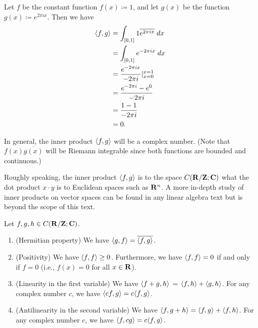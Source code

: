 \begin{example}\label{5.2.3}
    Let \(f\) be the constant function \(f(x) \coloneqq 1\), and let \(g(x)\) be the function \(g(x) \coloneqq e^{2 \pi i x}\).
    Then we have
    \begin{align*}
        \inner*{f, g} & = \int_{[0, 1]} 1 \overline{e^{2 \pi i x}} \; dx      \\
                      & = \int_{[0, 1]} e^{- 2 \pi i x} \; dx                 \\
                      & = \frac{e^{- 2 \pi i x}}{- 2 \pi i} |_{x = 0}^{x = 1} \\
                      & = \frac{e^{- 2 \pi i } - e^0}{- 2 \pi i}              \\
                      & = \frac{1 - 1}{- 2 \pi i}                             \\
                      & = 0.
    \end{align*}
\end{example}

\begin{remark}\label{5.2.4}
    In general, the inner product \(\inner*{f, g}\) will be a complex number.
    (Note that \(f(x) \overline{g(x)}\) will be Riemann integrable since both functions are bounded and continuous.)
\end{remark}

\begin{note}
    Roughly speaking, the inner product \(\inner*{f, g}\) is to the space \(C(\R / \Z ; \C)\) what the dot product \(x \cdot y\) is to Euclidean spaces such as \(\R^n\).
    A more in-depth study of inner products on vector spaces can be found in any linear algebra text but is beyond the scope of this text.
\end{note}

\begin{lemma}\label{5.2.5}
    Let \(f, g, h \in C(\R / \Z ; \C)\).
    \begin{enumerate}
        \item (Hermitian property)
              We have \(\inner*{g, f} = \overline{\inner*{f, g}}\).
        \item (Positivity)
              We have \(\inner*{f, f} \geq 0\).
              Furthermore, we have \(\inner*{f, f} = 0\) if and only if \(f = 0\)
              (i.e., \(f(x) = 0\) for all \(x \in \R\)).
        \item (Linearity in the first variable)
              We have \(\inner*{f +g, h}\) = \(\inner*{f, h} + \inner*{g, h}\).
              For any complex number \(c\), we have \(\inner*{cf, g} = c \inner*{f, g}\).
        \item (Antilinearity in the second variable)
              We have \(\inner*{f, g + h} = \inner*{f, g} + \inner*{f, h}\).
              For any complex number \(c\), we have \(\inner*{f, cg} = c \inner*{f, g}\).
    \end{enumerate}
\end{lemma}

